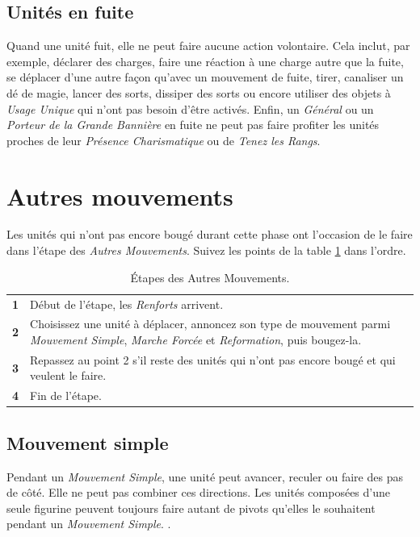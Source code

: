 \subsection{Unités en fuite}

Quand une unité fuit, elle ne peut faire aucune action volontaire. Cela inclut, par exemple, déclarer des charges, faire une réaction à une charge autre que la fuite, se déplacer d'une autre façon qu'avec un mouvement de fuite, tirer, canaliser un dé de magie, lancer des sorts, dissiper des sorts ou encore utiliser des objets à \emph{Usage Unique} qui n'ont pas besoin d'être activés. Enfin, un \emph{Général} ou un \emph{Porteur de la Grande Bannière} en fuite ne peut pas faire profiter les unités proches de leur \emph{Présence Charismatique} ou de \emph{Tenez les Rangs}.

\newpage
\section{Autres mouvements}

Les unités qui n'ont pas encore bougé durant cette phase ont l'occasion de le faire dans l'étape des \emph{Autres Mouvements}. Suivez les points de la table \ref{table/autres_mouvements} dans l'ordre.

\begin{table}[!htbp]
\centering
\begin{tabular}{c|m{12cm}}
\textbf{1} & Début de l'étape, les \emph{Renforts} arrivent. \tabularnewline
\textbf{2} & Choisissez une unité à déplacer, annoncez son type de mouvement parmi \emph{Mouvement Simple}, \emph{Marche Forcée} et \emph{Reformation}, puis bougez-la. \tabularnewline
\textbf{3} & Repassez au point 2 s'il reste des unités qui n'ont pas encore bougé et qui veulent le faire. \tabularnewline
\textbf{4} & Fin de l'étape. \tabularnewline
\end{tabular}
\caption{\label{table/autres_mouvements}Étapes des Autres Mouvements.}
\end{table}

\subsection{Mouvement simple}

Pendant un \emph{Mouvement Simple}, une unité peut avancer, reculer ou faire des pas de côté. Elle ne peut pas combiner ces directions. Les unités composées d'une seule figurine peuvent toujours faire autant de pivots qu'elles le souhaitent pendant un \emph{Mouvement Simple}. .


